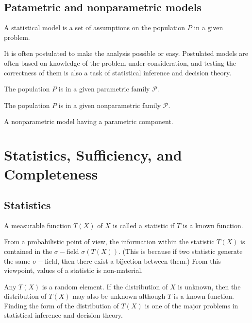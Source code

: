 \subsection{Patametric and nonparametric models}
\begin{definition}
A statistical model is a set of assumptions on the population $P$ in a given problem. 
\end{definition}
\begin{remark}
It is often postulated to make the analysis possible or easy. Postulated models are often based on knowledge of the problem under consideration, and testing the correctness of them is also a task of statistical inference and decision theory.
\end{remark}
\begin{example}
The population $P$ is in a given parametric family $\mathcal{P}$.
\end{example}
\begin{example}
The population $P$ is in a given nonparametric family $\mathcal{P}$.
\end{example}
\begin{example}
A nonparametric model having a parametric component.
\end{example}

\section{Statistics, Sufficiency, and Completeness}
\subsection{Statistics}
\begin{definition}[statistic]
A measurable function $T(X)$ of $X$ is called a statistic if $T$ is a known function.
\end{definition}
From a probabilistic point of view, the information within the statistic $T(X)$ is contained in the $\sigma-$field $\sigma(T(X))$. (This is because if two statistic generate the same $\sigma-$field, then there exist a bijection between them.) From this viewpoint, values of a statistic is non-material.\par
Any $T(X)$ is a random element. If the distribution of $X$ is unknown, then the distribution of $T(X)$ may also be unknown although $T$ is a known function. Finding the form of the distribution of $T(X)$ is one of the major problems in statistical inference and decision theory.
